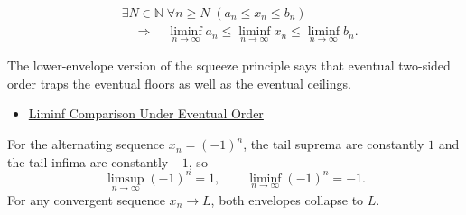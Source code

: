 \begin{remark*}
\[
\begin{aligned}
&\exists N\in\mathbb{N}\;\forall n\ge N\;(a_n\le x_n\le b_n)\\
&\quad\Longrightarrow\quad
\liminf_{n\to\infty}a_n
\le
\liminf_{n\to\infty}x_n
\le
\liminf_{n\to\infty}b_n.
\end{aligned}
\]
\end{remark*}

\begin{remark*}[Interpretation]
The lower-envelope version of the squeeze principle says that eventual
two-sided order traps the eventual floors as well as the eventual ceilings.
\end{remark*}

\begin{dependencies}
\begin{itemize}
  \item \hyperref[thm:liminf-comparison-under-eventual-order]{Liminf Comparison Under Eventual Order}
\end{itemize}
\end{dependencies}

\begin{remark*}
For the alternating sequence $x_n=(-1)^n$, the tail suprema are constantly
$1$ and the tail infima are constantly $-1$, so
\[
  \limsup_{n\to\infty}(-1)^n=1,
  \qquad
  \liminf_{n\to\infty}(-1)^n=-1.
\]
For any convergent sequence $x_n\to L$, both envelopes collapse to $L$.
\end{remark*}